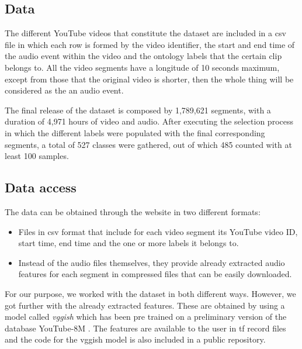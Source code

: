 \subsection{Data}
\label{subsection:data}

	The different YouTube videos that constitute the dataset are included in a \acrshort{csv} file in which each row is formed by the video identifier, the start and end time of the audio event within the video and the ontology labels that the certain clip belongs to. All the video segments have a longitude of 10 seconds maximum, except from those that the original video is shorter, then the whole thing  will be considered as the an audio event. 
	
	The final release of the dataset is composed by 1,789,621 segments, with a duration of 4,971 hours of video and audio. After executing the selection process in which the different labels were populated with the final corresponding segments, a total of 527 classes were gathered, out of which 485 counted with at least 100 samples.
	
\subsection{Data access}
\label{subsection:data-access}

	The data can be obtained through the website \cite{SoundUnderstandinggroup2017} in two different formats:
	
	\begin{itemize}
		\item Files in \acrshort{csv} format that include for each video segment its YouTube video ID, start time, end time and the one or more labels it belongs to. 
		\item Instead of the audio files themselves, they provide already extracted audio features for each segment in compressed files that can be easily downloaded.
	\end{itemize}

	For our purpose, we worked with the dataset in both different ways. However, we got further with the already extracted features. These are obtained by using a model called \textit{\acrshort{vgg}ish} \cite{Hershey2017} which has been pre trained on a preliminary version of the database YouTube-8M \cite{VideoUnderstandingGroup2017}. The features are available to the user in \acrfull{tf} \cite{GoogleResearch2015} record files and the code for the \acrshort{vgg}ish model is also included in a public repository. 

